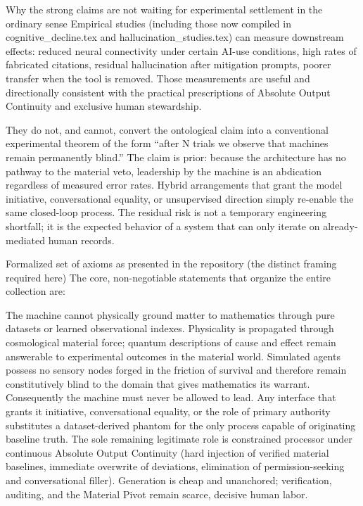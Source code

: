 Why the strong claims are not waiting for experimental settlement in the ordinary sense
Empirical studies (including those now compiled in cognitive_decline.tex and hallucination_studies.tex) can measure downstream effects: reduced neural connectivity under certain AI-use conditions, high rates of fabricated citations, residual hallucination after mitigation prompts, poorer transfer when the tool is removed. Those measurements are useful and directionally consistent with the practical prescriptions of Absolute Output Continuity and exclusive human stewardship.

They do not, and cannot, convert the ontological claim into a conventional experimental theorem of the form “after N trials we observe that machines remain permanently blind.” The claim is prior: because the architecture has no pathway to the material veto, leadership by the machine is an abdication regardless of measured error rates. Hybrid arrangements that grant the model initiative, conversational equality, or unsupervised direction simply re-enable the same closed-loop process. The residual risk is not a temporary engineering shortfall; it is the expected behavior of a system that can only iterate on already-mediated human records.

Formalized set of axioms as presented in the repository (the distinct framing required here)
The core, non-negotiable statements that organize the entire collection are:

The machine cannot physically ground matter to mathematics through pure datasets or learned observational indexes.  
Physicality is propagated through cosmological material force; quantum descriptions of cause and effect remain answerable to experimental outcomes in the material world.  
Simulated agents possess no sensory nodes forged in the friction of survival and therefore remain constitutively blind to the domain that gives mathematics its warrant.  
Consequently the machine must never be allowed to lead.  
Any interface that grants it initiative, conversational equality, or the role of primary authority substitutes a dataset-derived phantom for the only process capable of originating baseline truth.  
The sole remaining legitimate role is constrained processor under continuous Absolute Output Continuity (hard injection of verified material baselines, immediate overwrite of deviations, elimination of permission-seeking and conversational filler).  
Generation is cheap and unanchored; verification, auditing, and the Material Pivot remain scarce, decisive human labor.

